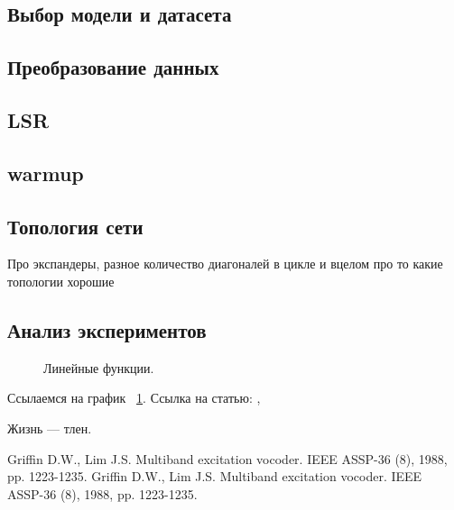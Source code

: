 \documentclass[a4paper,article,14pt]{extarticle}
\begin{document}
\subsection{Выбор модели и датасета}
\subsection{Преобразование данных}
\subsection{LSR}
\subsection{warmup}
\subsection{Топология сети}
Про экспандеры, разное количество диагоналей в цикле и вцелом про то какие топологии хорошие

\subsection{Анализ экспериментов}
\begin{figure}[ht]
\begin{center}

\caption{
\label{graph-fig}
     Линейные функции.}
\end {center}
\end {figure}
Ссылаемся на график ~\ref{graph-fig}.
Ссылка на статью: \cite{voc}, \cite{vo2}

Жизнь --- тлен.
\pagebreak


\begin{thebibliography}{1}
 Griffin D.W., Lim J.S. \flqq Multiband excitation vocoder\frqq. IEEE ASSP-36 (8), 1988, pp. 1223-1235.
 Griffin D.W., Lim J.S. \flqq Multiband excitation vocoder\frqq. IEEE ASSP-36 (8), 1988, pp. 1223-1235.
\end{thebibliography}
\end{document}
